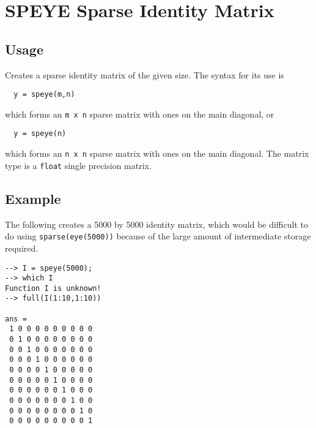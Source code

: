 \section{SPEYE Sparse Identity Matrix}

\subsection{Usage}

Creates a sparse identity matrix of the given size.  The syntax for
its use is
\begin{verbatim}
  y = speye(m,n)
\end{verbatim}
which forms an \verb|m x n| sparse matrix with ones on the main diagonal,
or
\begin{verbatim}
  y = speye(n)
\end{verbatim}
which forms an \verb|n x n| sparse matrix with ones on the main diagonal.  The
matrix type is a \verb|float| single precision matrix.
\subsection{Example}

The following creates a 5000 by 5000 identity matrix, which would be
difficult to do using \verb|sparse(eye(5000))| because of the large amount
of intermediate storage required.
\begin{verbatim}
--> I = speye(5000);
--> which I
Function I is unknown!
--> full(I(1:10,1:10))

ans = 
 1 0 0 0 0 0 0 0 0 0 
 0 1 0 0 0 0 0 0 0 0 
 0 0 1 0 0 0 0 0 0 0 
 0 0 0 1 0 0 0 0 0 0 
 0 0 0 0 1 0 0 0 0 0 
 0 0 0 0 0 1 0 0 0 0 
 0 0 0 0 0 0 1 0 0 0 
 0 0 0 0 0 0 0 1 0 0 
 0 0 0 0 0 0 0 0 1 0 
 0 0 0 0 0 0 0 0 0 1 
\end{verbatim}
